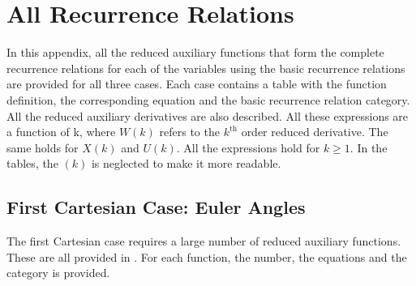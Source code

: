 \chapter{All Recurrence Relations}
\label{app:appendixD-allRecurrenceRelations}
In this appendix, all the reduced auxiliary functions that form the complete recurrence relations for each of the variables using the basic recurrence relations are provided for all three cases. Each case contains a table with the function definition, the corresponding equation and the basic recurrence relation category. All the reduced auxiliary derivatives are also described. All these expressions are a function of k, where $W\left(k\right)$ refers to the $k^{\text{th}}$ order reduced derivative. The same holds for $X\left(k\right)$ and $U\left(k\right)$. All the expressions hold for $k\geq1$. In the tables, the $\left(k\right)$ is neglected to make it more readable.

\section{First Cartesian Case: Euler Angles}
\label{sec:firCartApp}
The first Cartesian case requires a large number of reduced auxiliary functions. These are all provided in . For each function, the number, the equations and the category is provided.

